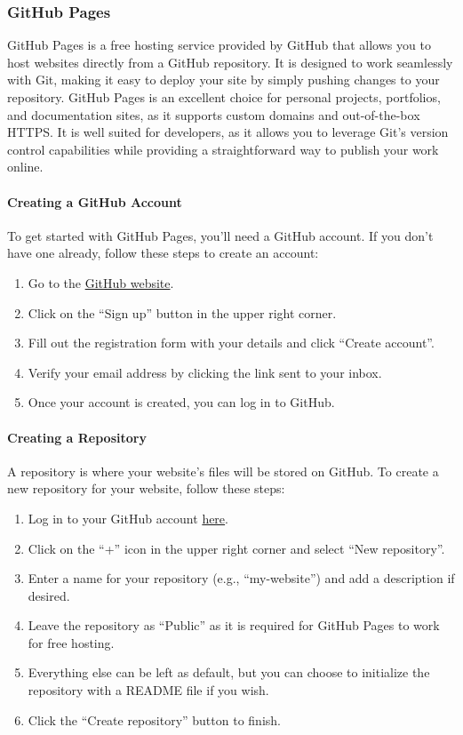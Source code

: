 \subsubsection{GitHub Pages}
GitHub Pages is a free hosting service provided by GitHub that allows you to host websites directly from a GitHub repository. It is designed to work seamlessly with Git, making it easy to deploy your site by simply pushing changes to your repository. GitHub Pages is an excellent choice for personal projects, portfolios, and documentation sites, as it supports custom domains and out-of-the-box HTTPS. It is well suited for developers, as it allows you to leverage Git's version control capabilities while providing a straightforward way to publish your work online.

\paragraph{Creating a GitHub Account}
To get started with GitHub Pages, you'll need a GitHub account. If you don't have one already, follow these steps to create an account:
\begin{enumerate}
    \item Go to the \href{https://github.com/}{GitHub website}.
    \item Click on the ``Sign up'' button in the upper right corner.
    \item Fill out the registration form with your details and click ``Create account''.
    \item Verify your email address by clicking the link sent to your inbox.
    \item Once your account is created, you can log in to GitHub.
\end{enumerate}

\paragraph{Creating a Repository}
A repository is where your website's files will be stored on GitHub. To create a new repository for your website, follow these steps:
\begin{enumerate}
    \item Log in to your GitHub account \href{https://github.com/login}{here}.
    \item Click on the ``+'' icon in the upper right corner and select ``New repository''.
    \item Enter a name for your repository (e.g., ``my-website'') and add a description if desired.
    \item Leave the repository as ``Public'' as it is required for GitHub Pages to work for free hosting.
    \item Everything else can be left as default, but you can choose to initialize the repository with a README file if you wish.
    \item Click the ``Create repository'' button to finish.
\end{enumerate}

